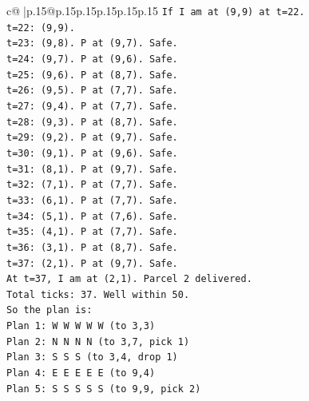 \documentclass{article}
\begin{document}
{\begin{supertabular}{c@{$\;$}|p{.15\linewidth}@{}p{.15\linewidth}p{.15\linewidth}p{.15\linewidth}p{.15\linewidth}p{.15\linewidth}}
{{{\texttt{If I am at (9,9) at t=22.} \\
\texttt{t=22: (9,9).} \\
\texttt{t=23: (9,8). P at (9,7). Safe.} \\
\texttt{t=24: (9,7). P at (9,6). Safe.} \\
\texttt{t=25: (9,6). P at (8,7). Safe.} \\
\texttt{t=26: (9,5). P at (7,7). Safe.} \\
\texttt{t=27: (9,4). P at (7,7). Safe.} \\
\texttt{t=28: (9,3). P at (8,7). Safe.} \\
\texttt{t=29: (9,2). P at (9,7). Safe.} \\
\texttt{t=30: (9,1). P at (9,6). Safe.} \\
\texttt{t=31: (8,1). P at (9,7). Safe.} \\
\texttt{t=32: (7,1). P at (7,7). Safe.} \\
\texttt{t=33: (6,1). P at (7,7). Safe.} \\
\texttt{t=34: (5,1). P at (7,6). Safe.} \\
\texttt{t=35: (4,1). P at (7,7). Safe.} \\
\texttt{t=36: (3,1). P at (8,7). Safe.} \\
\texttt{t=37: (2,1). P at (9,7). Safe.} \\
\texttt{At t=37, I am at (2,1). Parcel 2 delivered.} \\
\texttt{Total ticks: 37. Well within 50.} \\
\texttt{So the plan is:} \\
\texttt{Plan 1: W W W W W (to 3,3)} \\
\texttt{Plan 2: N N N N (to 3,7, pick 1)} \\
\texttt{Plan 3: S S S (to 3,4, drop 1)} \\
\texttt{Plan 4: E E E E E (to 9,4)} \\
\texttt{Plan 5: S S S S S (to 9,9, pick 2)} \\
}}}
\end{supertabular}}
\end{document}
